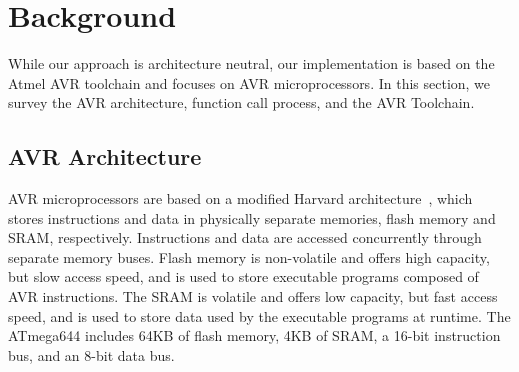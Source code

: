 \vspace{-15pt}
\section{Background}\label{sec:background}
\vspace{-5pt}
While our approach is architecture neutral, our implementation is based on the Atmel AVR toolchain and focuses on AVR microprocessors. In this section, we survey the AVR architecture, function call process, and the AVR Toolchain.

\vspace{-15pt}
\subsection{AVR Architecture}
\vspace{-5pt}
AVR microprocessors are based on a modified Harvard architecture~\cite{argade1996apparatus}, which stores instructions and data in physically separate memories, flash memory and SRAM, respectively. Instructions and data are accessed concurrently through separate memory buses. Flash memory is non-volatile and offers high capacity, but slow access speed, and is used to store executable programs composed of AVR instructions. The SRAM is volatile and offers low capacity, but fast access speed, and is used to store data used by the executable programs at runtime. The ATmega644 includes 64KB of flash memory, 4KB of SRAM, a 16-bit instruction bus, and an 8-bit data bus.
\vspace{-20pt}
